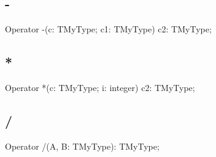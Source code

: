 \documentclass{report}
\begin{document}
\subsection*{-}
\begin{list}{}{
\setlength{\itemindent}{0cm}
\setlength{\listparindent}{0cm}
\setlength{\leftmargin}{\evensidemargin}
\addtolength{\leftmargin}{\tmplength}
\settowidth{\labelsep}{X}
\addtolength{\leftmargin}{\labelsep}
\setlength{\labelwidth}{\tmplength}
}
\begin{flushleft}
\item[\textbf{Declaration}\hfill]
\begin{ttfamily}
Operator -(c: TMyType; c1: TMyType) c2: TMyType;\end{ttfamily}


\end{flushleft}
\end{list}
\subsection*{*}
\begin{list}{}{
\setlength{\itemindent}{0cm}
\setlength{\listparindent}{0cm}
\setlength{\leftmargin}{\evensidemargin}
\addtolength{\leftmargin}{\tmplength}
\settowidth{\labelsep}{X}
\addtolength{\leftmargin}{\labelsep}
\setlength{\labelwidth}{\tmplength}
}
\begin{flushleft}
\item[\textbf{Declaration}\hfill]
\begin{ttfamily}
Operator *(c: TMyType; i: integer) c2: TMyType;\end{ttfamily}


\end{flushleft}
\end{list}
\subsection*{/}
\begin{list}{}{
\setlength{\itemindent}{0cm}
\setlength{\listparindent}{0cm}
\setlength{\leftmargin}{\evensidemargin}
\addtolength{\leftmargin}{\tmplength}
\settowidth{\labelsep}{X}
\addtolength{\leftmargin}{\labelsep}
\setlength{\labelwidth}{\tmplength}
}
\begin{flushleft}
\item[\textbf{Declaration}\hfill]
\begin{ttfamily}
Operator /(A, B: TMyType): TMyType;\end{ttfamily}


\end{flushleft}
\end{list}
\end{document}
